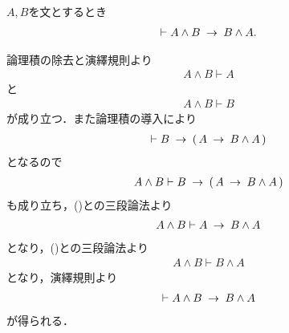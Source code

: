 	\begin{screen}
		\begin{logicalthm}[論理積の可換律]
		\label{logicalthm:commutative_law_of_conjunction}
			$A,B$を文とするとき
			\begin{align}
				\vdash A \wedge B \hspace{0.25em}\rightarrow\hspace{0.25em} B \wedge A.
			\end{align}
		\end{logicalthm}
	\end{screen}
	
	\begin{prf}
		論理積の除去と演繹規則より
		\begin{align}
			A \wedge B \vdash A
			\label{fom:logicalthm_commutative_law_of_conjunction_1}
		\end{align}
		と
		\begin{align}
			A \wedge B \vdash B
			\label{fom:logicalthm_commutative_law_of_conjunction_2}
		\end{align}
		が成り立つ．また論理積の導入により
		\begin{align}
			\vdash B \hspace{0.25em}\rightarrow\hspace{0.25em} (\, A \hspace{0.25em}\rightarrow\hspace{0.25em} B \wedge A\, )
		\end{align}
		となるので
		\begin{align}
			A \wedge B \vdash B \hspace{0.25em}\rightarrow\hspace{0.25em} (\, A \hspace{0.25em}\rightarrow\hspace{0.25em} B \wedge A\, )
		\end{align}
		も成り立ち，()との三段論法より
		\begin{align}
			A \wedge B \vdash A \hspace{0.25em}\rightarrow\hspace{0.25em} B \wedge A
		\end{align}
		となり，()との三段論法より
		\begin{align}
			A \wedge B \vdash B \wedge A
		\end{align}
		となり，演繹規則より
		\begin{align}
			\vdash A \wedge B \hspace{0.25em}\rightarrow\hspace{0.25em} B \wedge A
		\end{align}
		が得られる．
		\QED
	\end{prf}